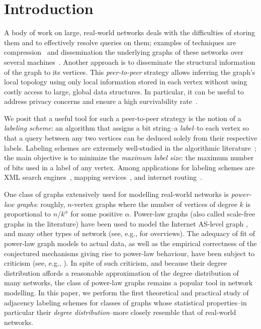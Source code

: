 

\section{Introduction}
A body of work on large, real-world networks  deals with the difficulties of storing them and to effectively resolve queries on them; examples of techniques are
compression~\cite{boldi2004webgraph,boldi2011layered} and dissemination  the underlying graphs of these networks over several machines~\cite{gonzalez2012powergraph, stanton2012streaming, xie2014distributed}.
Another approach is to disseminate the structural information of the graph to its vertices. This \emph{peer-to-peer} strategy allows inferring the graph's local topology using only local information stored in each vertex without using costly access to large, global data structures.
In particular, it can be useful to address privacy concerns and ensure a high survivability rate~\cite{buchegger2009peerson}.

We posit that a useful tool for such a peer-to-peer strategy is the notion of a \emph{labeling scheme}: an algorithm that assigns a bit string--a \emph{label}--to each vertex so that a query between any two vertices can be deduced solely from their respective labels. 
Labeling schemes are extremely well-studied in the algorithmic literature~\cite{alstrup2014adjacency,brady2006compact,caminiti2008engineering,dahlgaard2014dynamic,gavoillea2004distance,gavoille2007shorter,katz2004labeling,korman2007general,korman2007compact,Korman07,rotbart2014evaluation}; the main objective is to minimize the \emph{maximum label size}: the maximum number of bits used in a label of any vertex. Among applications for labeling schemes are  XML search engines~\cite{cohen2010labeling}, mapping services~\cite{abraham2011hub}, and internet routing~\cite{krioukov2004compact}.

One class of graphs extensively used for modelling real-world networks is \emph{power-law graphs}: roughly, $n$-vertex graphs where the number of vertices of degree $k$ is proportional to $n/k^{\alpha}$ for some positive $\alpha$. Power-law graphs (also called scale-free graphs in the literature) have been used to model the Internet AS-level graph \cite{DBLP:journals/ton/SiganosFFF03,DBLP:conf/podc/AkellaCKS03}, and many other types of network (see, e.g., \cite{clauset2009power,mitzenmacher2004brief} for overviews). 
The adequacy of fit of power-law graph models to actual data, as well as the empirical correctness of the conjectured mechanisms giving rise to power-law behaviour, have been subject to criticism (see, e.g., \cite{DBLP:journals/jacm/AchlioptasCKM09,clauset2009power}).
 In spite of such criticism, and because their degree distribution affords a reasonable approximation of the degree distribution of many networks, the class of power-law graphs remains a popular tool in network modelling.
In this paper, we perform the first theoretical and practical study of adjacency labeling schemes for classes of graphs whose statistical properties--in particular their \emph{degree distribution}--more closely resemble that of real-world networks.


